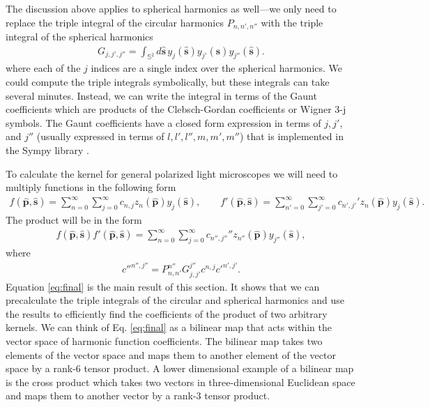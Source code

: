 \documentclass[11pt]{article}
\providecommand{\mh}[1]{\mathbf{\hat{#1}}}
\providecommand{\mbb}[1]{\mathbb{#1}}
\begin{document}
  The discussion above applies to spherical harmonics as well---we only need to replace
  the triple integral of the circular harmonics $P_{n,n',n''}$ with the triple integral
  of the spherical harmonics
  \begin{align}
    G_{j,j',j''} = \int_{\mbb{S}^2}d\mh{s}\, y_{j}(\mh{s})y_{j'}(\mh{s})y_{j''}(\mh{s}).
  \end{align}
  where each of the $j$ indices are a single index over the spherical harmonics.
  We could compute the triple integrals symbolically, but these integrals can
  take several minutes. Instead, we can write the integral in terms of the Gaunt
  coefficients \cite{homeier1996} which are products of the Clebsch-Gordan
  coefficients or Wigner 3-j symbols. The Gaunt coefficients have a closed form
  expression in terms of $j,j'$, and $j''$ (usually expressed in terms of
  $l,l',l'',m,m',m''$) that is implemented in the Sympy library \cite{sympy}.

  To calculate the kernel for general polarized light microscopes we will need to multiply functions in the following form
  \begin{align}
  f(\mh{p}, \mh{s}) = \sum_{n=0}^\infty\sum_{j=0}^\infty c_{n,j} z_n(\mh{p})y_j(\mh{s}), \qquad f'(\mh{p}, \mh{s}) = \sum_{n'=0}^\infty\sum_{j'=0}^\infty c_{n',j'}' z_n(\mh{p})y_j(\mh{s}).
\end{align}
The product will be in the form
\begin{align}
  f(\mh{p}, \mh{s})f'(\mh{p}, \mh{s}) = \sum_{n=0}^\infty\sum_{j=0}^\infty c_{n'',j''}'' z_{n''}(\mh{p})y_{j''}(\mh{s}),
\end{align}
where
\begin{align}
  {c''}^{n'', j''} = P_{n,n'}^{n''} G_{j,j'}^{j''} c^{n,j} {c'}^{n', j'}.\label{eq:final}
\end{align}
Equation \ref{eq:final} is the main result of this section. It shows that we can
precalculate the triple integrals of the circular and spherical harmonics and
use the results to efficiently find the coefficients of the product of two
arbitrary kernels. We can think of Eq. \ref{eq:final} as a bilinear map that
acts within the vector space of harmonic function coefficients. The bilinear map
takes two elements of the vector space and maps them to another element of the
vector space by a rank-6 tensor product. A lower dimensional example of a
bilinear map is the cross product which takes two vectors in three-dimensional
Euclidean space and maps them to another vector by a rank-3 tensor product.
\end{document}
